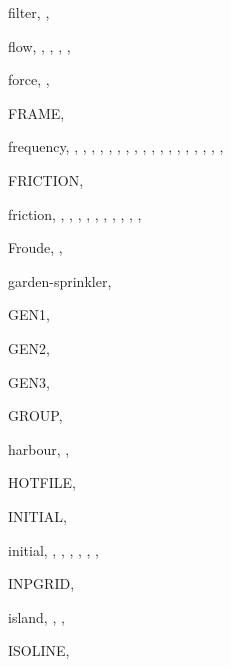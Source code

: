 \documentclass[12pt]{book}
\begin{document}
\begin{theindex}
  \item filter, , 
  \item flow, , , , 
		, 
  \item force, , 
  \item FRAME, 
  \item frequency, , , , 
		, , , 
		, , , 
		, , , 
		, , , 
		, , , 
  \item FRICTION, 
  \item friction, , , 
		, , , 
		, , , 
		, , 
  \item Froude, , 

  \indexspace

  \item garden-sprinkler, 
  \item GEN1, 
  \item GEN2, 
  \item GEN3, 
  \item GROUP, 

  \indexspace

  \item harbour, , 
  \item HOTFILE, 

  \indexspace

  \item INITIAL, 
  \item initial, , , , 
		, , , 
  \item INPGRID, 
  \item island, , , 
  \item ISOLINE, 

  \indexspace


\end{theindex}
\end{document}
